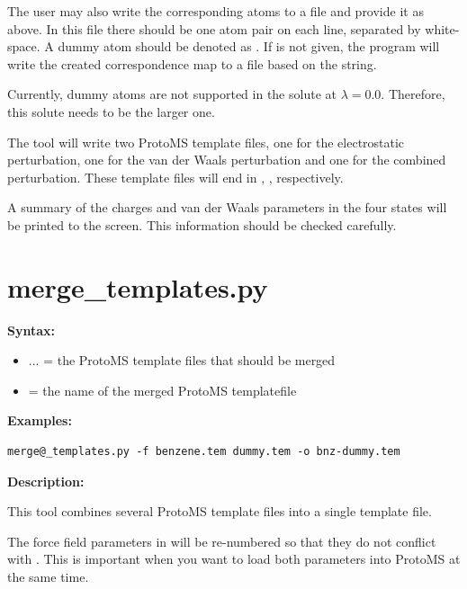 \documentclass[letterpaper,10pt,english]{manual}
\begin{document}
The user may also write the corresponding atoms to a file and provide it as  above. In this file there should be one atom pair on each line, separated by white-space. A dummy atom should be denoted as . If  is not given, the program will write the created correspondence map to a file based on the  string.

Currently, dummy atoms are not supported in the solute at $\lambda=0.0$. Therefore, this solute needs to be the larger one.

The tool will write two ProtoMS template files, one for the electrostatic perturbation, one for the van der Waals perturbation and one for the combined perturbation. These template files will end in , ,  respectively.

A summary of the charges and van der Waals parameters in the four states will be printed to the screen. This information should be checked carefully.


\section{merge\_templates.py}

\textbf{Syntax:}

\begin{itemize}
\item {} 
 ... = the ProtoMS template files that should be merged

\item {} 
 = the name of the merged ProtoMS templatefile

\end{itemize}

\textbf{Examples:}

\begin{Verbatim}[commandchars=@\[\]]
merge@_templates.py -f benzene.tem dummy.tem -o bnz-dummy.tem
\end{Verbatim}

\textbf{Description:}

This tool combines several ProtoMS template files into a single template file.

The force field parameters in  will be re-numbered so that they do not conflict with . This is important when you want to load both parameters into ProtoMS at the same time.
\end{document}
